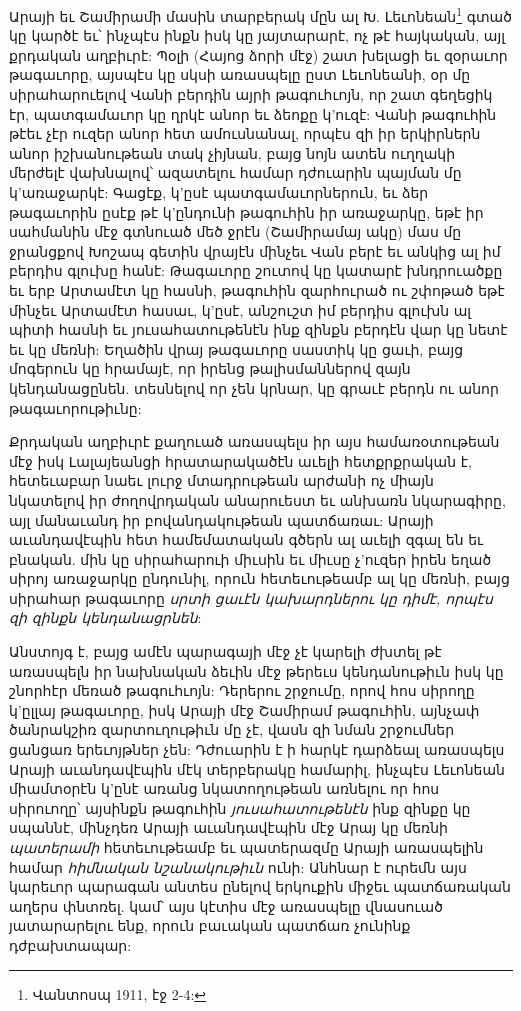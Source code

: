 \documentclass{article}
\begin{document}
{Արայի եւ Շամիրամի մասին տարբերակ մըն ալ Խ. Լեւոնեան\footnote{Վանտոսպ 1911, էջ 2-4:} գտած կը կարծէ եւ՝ ինչպէս ինքն իսկ կը յայտարարէ, ոչ թէ հայկական, այլ քրդական աղբիւրէ: Պօլի (Հայոց ձորի մէջ) շատ խելացի եւ զօրաւոր թագաւորը, այսպէս կը սկսի առասպելը ըստ Լեւոնեանի, օր մը սիրահարուելով Վանի բերդին այրի թագուհւոյն, որ շատ գեղեցիկ էր, պատգամաւոր կը ղրկէ անոր եւ ձեոքը կ'ուզէ: Վանի թագուհին թէեւ չէր ուզեր անոր հետ ամուսնանալ, որպէս զի իր երկիրներն անոր իշխանութեան տակ չիյնան, բայց նոյն ատեն ուղղակի մերժելէ վախնալով՝ ազատելու համար դժուարին պայման մը կ'առաջարկէ: Գացէք, կ'ըսէ պատգամաւորներուն, եւ ձեր թագաւորին ըսէք թէ կ'ընդունի թագուհին իր առաջարկը, եթէ իր սահմանին մէջ գտնուած մեծ ջրէն (Շամիրամայ ակը) մաս մը ջրանցքով Խոշապ գետին վրայէն մինչեւ Վան բերէ եւ անկից ալ իմ բերդիս գլուխը հանէ: Թագաւորը շուտով կը կատարէ խնդրուածքը եւ երբ Արտամէտ կը հասնի, թագուհին զարհուրած ու շփոթած եթէ մինչեւ Արտամէտ հասաւ, կ'ըսէ, անշուշտ իմ բերդիս գլուխն ալ պիտի հասնի եւ յուսահատութենէն ինք զինքն բերդէն վար կը նետէ եւ կը մեռնի: Եղածին վրայ թագաւորը սաստիկ կը ցաւի, բայց մոգերուն կը հրամայէ, որ իրենց թալիսմաններով զայն կենդանացընեն. տեսնելով որ չեն կրնար, կը գրաւէ բերդն ու անոր թագաւորութիւնը:

Քրդական աղբիւրէ քաղուած առասպելս իր այս համառօտութեան մէջ իսկ Լալայեանցի հրատարակածէն աւելի հետքրքրական է, հետեւաբար նաեւ լուրջ մտադրութեան արժանի ոչ միայն նկատելով իր ժողովրդական անարուեստ եւ անխառն նկարագիրը, այլ մանաւանդ իր բովանդակութեան պատճառաւ: Արայի աւանդավէպին հետ համեմատական գծերն ալ աւելի զգալ են եւ բնական. մին կը սիրահարուի միւսին եւ միւսը չ'ուզեր իրեն եղած սիրոյ առաջարկը ընդունիլ, որուն հետեւութեամբ ալ կը մեռնի, բայց սիրահար թագաւորը \emph{սրտի ցաւէն կախարդներու կը դիմէ, որպէս զի զինքն կենդանացրնեն}:

Անստոյգ է, բայց ամէն պարագայի մէջ չէ կարելի ժխտել թէ առասպելն իր նախնական ձեւին մէջ թերեւս կենդանութիւն իսկ կը շնորհէր մեռած թագուհւոյն: Դերերու շրջումը, որով հոս սիրողը կ'ըլլայ թագաւորը, իսկ Արայի մէջ Շամիրամ թագուհին, այնչափ ծանրակշիռ զարտուղութիւն մը չէ, վասն զի նման շրջումներ ցանցառ երեւոյթներ չեն: Դժուարին է ի հարկէ դարձեալ առասպելս Արայի աւանդավէպին մէկ տերբերակը համարիլ, ինչպէս Լեւոնեան միամտօրէն կ'ընէ առանց նկատողութեան առնելու որ հոս սիրուողը՝ այսինքն թագուհին \emph{յուսահատութենէն} ինք զինքը կը սպաննէ, մինչդեռ Արայի աւանդավէպին մէջ Արայ կը մեռնի \emph{պատերամի} հետեւութեամբ եւ պատերազմը Արայի առասպելին համար \emph{հիմնական նշանակութիւն} ունի: Անհնար է ուրեմն այս կարեւոր պարագան անտես ընելով երկուքին միջեւ պատճառական աղերս փնտռել. կամ՝ այս կէտիս մէջ առասպելը վնասուած յատարարելու ենք, որուն բաւական պատճառ չունինք դժբախտապար:

}
\end{document}
